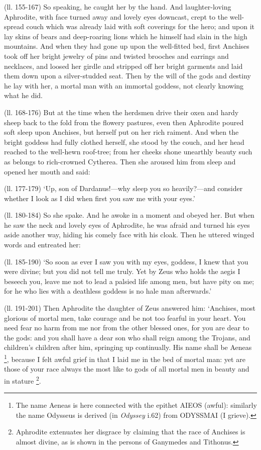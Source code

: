 (ll. 155-167) So speaking, he caught her by the hand. And laughter-loving
Aphrodite, with face turned away and lovely eyes downcast, crept to the
well-spread couch which was already laid with soft coverings for the hero; and
upon it lay skins of bears and deep-roaring lions which he himself had slain in
the high mountains. And when they had gone up upon the well-fitted bed, first
Anchises took off her bright jewelry of pins and twisted brooches and earrings
and necklaces, and loosed her girdle and stripped off her bright garments and
laid them down upon a silver-studded seat. Then by the will of the gods and
destiny he lay with her, a mortal man with an immortal goddess, not clearly
knowing what he did.

(ll. 168-176) But at the time when the herdsmen drive their oxen and hardy
sheep back to the fold from the flowery pastures, even then Aphrodite poured
soft sleep upon Anchises, but herself put on her rich raiment. And when the
bright goddess had fully clothed herself, she stood by the couch, and her head
reached to the well-hewn roof-tree; from her cheeks shone unearthly beauty such
as belongs to rich-crowned Cytherea. Then she aroused him from sleep and opened
her mouth and said:

(ll. 177-179) ‘Up, son of Dardanus!—why sleep you so
heavily?—and consider whether I look as I did when first you saw me with
your eyes.’

(ll. 180-184) So she spake. And he awoke in a moment and obeyed her. But when
he saw the neck and lovely eyes of Aphrodite, he was afraid and turned his eyes
aside another way, hiding his comely face with his cloak. Then he uttered
winged words and entreated her:

(ll. 185-190) ‘So soon as ever I saw you with my eyes, goddess, I knew
that you were divine; but you did not tell me truly. Yet by Zeus who holds the
aegis I beseech you, leave me not to lead a palsied life among men, but have
pity on me; for he who lies with a deathless goddess is no hale man
afterwards.’

(ll. 191-201) Then Aphrodite the daughter of Zeus answered him:
‘Anchises, most glorious of mortal men, take courage and be not too
fearful in your heart. You need fear no harm from me nor from the other blessed
ones, for you are dear to the gods: and you shall have a dear son who shall
reign among the Trojans, and children’s children after him, springing up
continually. His name shall be Aeneas \footnote{The name Aeneas is here
connected with the epithet AIEOS (awful): similarly the name Odysseus is
derived (in \emph{Odyssey} i.62) from ODYSSMAI (I grieve).}, because
I felt awful grief in that I laid me in the bed of mortal man: yet are those of
your race always the most like to gods of all mortal men in beauty and in
stature \footnote{Aphrodite extenuates her
disgrace by claiming that the race of Anchises is almost divine, as is shown in
the persons of Ganymedes and Tithonus.}.

